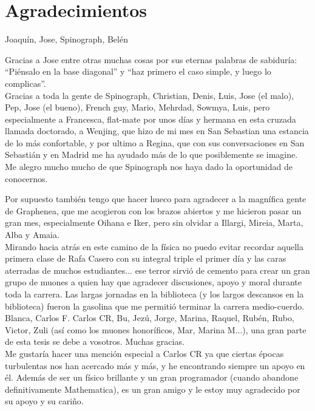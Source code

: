 \chapter*{Agradecimientos}
Joaquín, Jose, Spinograph, Belén %


Gracias a Jose entre otras muchas cosas por sus eternas palabras de sabiduría: ``Piénsalo en la base diagonal'' y ``haz primero el caso simple, y luego lo complicas''.\\

Gracias a toda la gente de Spinograph, Christian, Denis, Luis, Jose (el malo), Pep, Jose (el bueno), French guy, Mario, Mehrdad, Sowmya, Luis, pero especialmente a Francesca, flat-mate por unos días y hermana en esta cruzada llamada doctorado, a Wenjing, que hizo de mi mes en San Sebastian una estancia de lo más confortable, y por ultimo a Regina, que con sus conversaciones en San Sebastián y en Madrid me ha ayudado más de lo que posiblemente se imagine. Me alegro mucho mucho de que Spinograph nos haya dado la oportunidad de conocernos.

Por supuesto también tengo que hacer hueco para agradecer a la magnífica gente de Graphenea, que me acogieron con los brazos abiertos y me hicieron pasar un gran mes, especialmente Oihana e Iker, pero sin olvidar a Illargi, Mireia, Marta, Alba y Amaia.\\


Mirando hacia atrás en este camino de la física no puedo evitar recordar aquella primera clase de Rafa Casero con su integral triple el primer día y las caras aterradas de muchos estudiantes... ese terror sirvió de cemento para crear un gran grupo de muones a quien hay que agradecer discusiones, apoyo y moral durante toda la carrera.
Las largas jornadas en la biblioteca (y los largos descansos en la biblioteca) fueron la gasolina que me permitió terminar la carrera medio-cuerdo. Blanca, Carlos F. Carlos CR, Bu, Jezú, Jorge, Marina, Raquel, Rubén, Rubo, Victor, Zuli (así como los muones honoríficos, Mar, Marina M...), una gran parte de esta tesis se debe a vosotros. Muchas gracias.\\

Me gustaría hacer una mención especial a Carlos CR ya que ciertas épocas turbulentas nos han acercado más y más, y he encontrando siempre un apoyo en él. Además de ser un físico brillante y un gran programador (cuando abandone definitivamente Mathematica), es un gran amigo y le estoy muy agradecido por su apoyo y su cariño.\\


